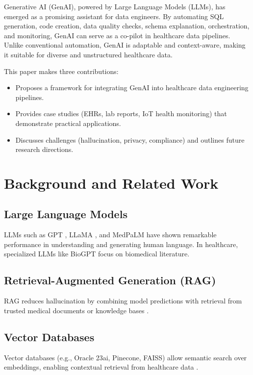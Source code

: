 \documentclass[conference]{IEEEtran}
\begin{document}
Generative AI (GenAI), powered by Large Language Models (LLMs), has emerged as a promising assistant for data engineers. By automating SQL generation, code creation, data quality checks, schema explanation, orchestration, and monitoring, GenAI can serve as a co-pilot in healthcare data pipelines. Unlike conventional automation, GenAI is adaptable and context-aware, making it suitable for diverse and unstructured healthcare data.

This paper makes three contributions:
\begin{itemize}
    \item Proposes a framework for integrating GenAI into healthcare data engineering pipelines.
    \item Provides case studies (EHRs, lab reports, IoT health monitoring) that demonstrate practical applications.
    \item Discusses challenges (hallucination, privacy, compliance) and outlines future research directions.
\end{itemize}

\section{Background and Related Work}
\subsection{Large Language Models}
LLMs such as GPT \cite{brown2020gpt3}, LLaMA \cite{touvron2023llama}, and MedPaLM \cite{singhal2023medpalm} have shown remarkable performance in understanding and generating human language. In healthcare, specialized LLMs like BioGPT \cite{luo2022biogpt} focus on biomedical literature.

\subsection{Retrieval-Augmented Generation (RAG)}
RAG reduces hallucination by combining model predictions with retrieval from trusted medical documents or knowledge bases \cite{lewis2020rag}.

\subsection{Vector Databases}
Vector databases (e.g., Oracle 23ai, Pinecone, FAISS) allow semantic search over embeddings, enabling contextual retrieval from healthcare data \cite{johnson2019billion}.
\end{document}
